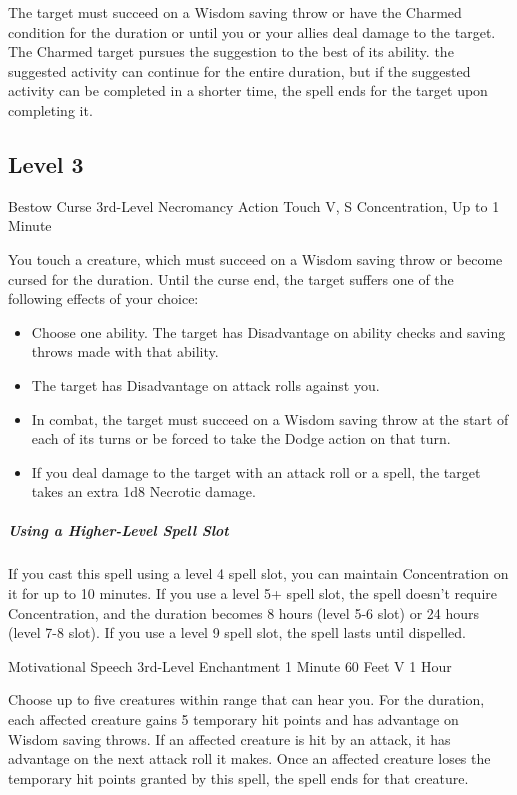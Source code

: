 \documentclass[letterpaper,openany,oneside,twocolumn]{book}
\begin{document}
The target must succeed on a Wisdom saving throw or have the Charmed condition for the duration or until you or your allies deal damage to the target. The Charmed target pursues the suggestion to the best of its ability. the suggested activity can continue for the entire duration, but if the suggested activity can be completed in a shorter time, the spell ends for the target upon completing it.

\subsection*{Level 3}

\DndSpellHeader
  {Bestow Curse}
  {3rd-Level Necromancy}
  {Action}
  {Touch}
  {V, S}
  {Concentration, Up to 1 Minute}

You touch a creature, which must succeed on a Wisdom saving throw or become cursed for the duration. Until the curse end, the target suffers one of the following effects of your choice:
\begin{itemize}
	\item Choose one ability. The target has Disadvantage on ability checks and saving throws made with that ability.
	\item The target has Disadvantage on attack rolls against you.
	\item In combat, the target must succeed on a Wisdom saving throw at the start of each of its turns or be forced to take the Dodge action on that turn.
	\item If you deal damage to the target with an attack roll or a spell, the target takes an extra 1d8 Necrotic damage.
\end{itemize}

\subparagraph*{Using a Higher-Level Spell Slot} If you cast this spell using a level 4 spell slot, you can maintain Concentration on it for up to 10 minutes. If you use a level 5+ spell slot, the spell doesn't require Concentration, and the duration becomes 8 hours (level 5-6 slot) or 24 hours (level 7-8 slot). If you use a level 9 spell slot, the spell lasts until dispelled.

\DndSpellHeader
  {Motivational Speech}
  {3rd-Level Enchantment}
  {1 Minute}
  {60 Feet}
  {V}
  {1 Hour}

Choose up to five creatures within range that can hear you. For the duration, each affected creature gains 5 temporary hit points and has advantage on Wisdom saving throws. If an affected creature is hit by an attack, it has advantage on the next attack roll it makes. Once an affected creature loses the temporary hit points granted by this spell, the spell ends for that creature.
\end{document}
